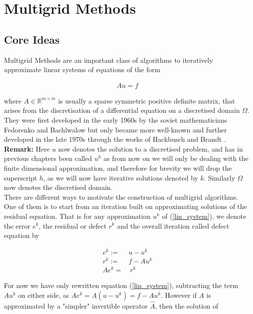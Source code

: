 \documentclass[../draft_1.tex]{subfiles}
\begin{document}
\chapter{Multigrid Methods}

\section{Core Ideas}
Multigrid Methods are an important class of algorithms to iteratively approximate linear systems of equations of the form
 \begin{ceqn}
 	\begin{align}
 	\label{lin_system}
 Au = f 
 	\end{align}
\end{ceqn}

 where $A \in \mathbb{R}^{m \times m}$ is usually a sparse symmetric positive definite matrix, that arises from the discretisation of a differential equation on a discretised domain $\Omega$. They were first developed in the early 1960s by the soviet mathematicians Fedorenko and Bachlwalow but only became more well-known and further developed in the late 1970s through the works of Hackbusch \cite{hackbusch2013multi} and Brandt \cite{brandt1977multi}.
\smallskip
\\
\textbf{Remark:} Here $u$ now denotes the solution to a discretised problem, and has in previous chapters been called $u^h$ as from now on we will only be dealing with the finite dimensional approximation, and therefore for brevity we will drop the superscript $h$, as we will now have iterative solutions denoted by $k$. Similarly $\Omega$ now denotes the discretised domain.
\smallskip
\\
There are different ways to motivate the construction of multigrid algorithms. One of them is to start from an iteration built on approximating solutions of the residual equation. That is for any approximation $u^k$ of (\ref{lin_system}), we denote the error $e^k$, the residual or defect $r^k$ and the overall iteration called defect equation by
\begin{ceqn}
	\begin{align}
	e^k :=& u - u^k \\
	r^k :=& f - Au^k \\
	\label{defect_equation}
	A e^k =& \ r^k	
	\end{align}
\end{ceqn}
For now we have only rewritten equation (\ref{lin_system}), subtracting the term $Au^k$ on either side, as $A e^k = A( u - u^k) = f - Au^k$. However if $A$ is approximated by a "simpler" invertible operator $\hat{A}$, then the solution of 
\end{document}
